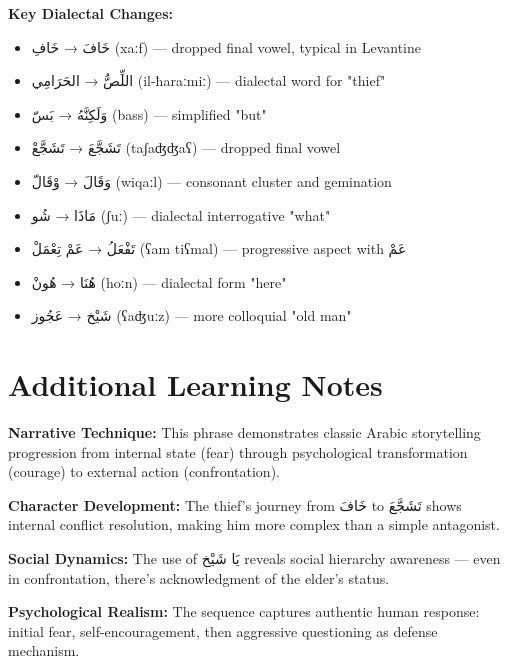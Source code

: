 \documentclass[letterpaper,12pt]{article}
\begin{document}
\textbf{Key Dialectal Changes:}
\begin{itemize}
\item \textarabic{خَافَ} → \textarabic{خَافِ} (xaːf) — dropped final vowel, typical in Levantine
\item \textarabic{اللِّصُّ} → \textarabic{الحَرَامِي} (il-ħaraːmiː) — dialectal word for "thief"
\item \textarabic{وَلَكِنَّهُ} → \textarabic{بَسّ} (bass) — simplified "but"
\item \textarabic{تَشَجَّعَ} → \textarabic{تَشَجَّعْ} (taʃaʤʤaʕ) — dropped final vowel
\item \textarabic{وَقَالَ} → \textarabic{وْقَالّ} (wiqaːl) — consonant cluster and gemination
\item \textarabic{مَاذَا} → \textarabic{شُو} (ʃuː) — dialectal interrogative "what"
\item \textarabic{تَفْعَلُ} → \textarabic{عَمْ تِعْمَلْ} (ʕam tiʕmal) — progressive aspect with \textarabic{عَمْ}
\item \textarabic{هُنَا} → \textarabic{هُونْ} (hoːn) — dialectal form "here"
\item \textarabic{شَيْخ} → \textarabic{عَجُوز} (ʕaʤuːz) — more colloquial "old man"
\end{itemize}

\section{Additional Learning Notes}

\begin{tcolorbox}[colback=boxcolor,colframe=accentcolor,title=\textbf{Cultural and Literary Context},breakable]
\textbf{Narrative Technique:} This phrase demonstrates classic Arabic storytelling progression from internal state (fear) through psychological transformation (courage) to external action (confrontation).

\textbf{Character Development:} The thief's journey from \textarabic{خَافَ} to \textarabic{تَشَجَّعَ} shows internal conflict resolution, making him more complex than a simple antagonist.

\textbf{Social Dynamics:} The use of \textarabic{يَا شَيْخ} reveals social hierarchy awareness — even in confrontation, there's acknowledgment of the elder's status.

\textbf{Psychological Realism:} The sequence captures authentic human response: initial fear, self-encouragement, then aggressive questioning as defense mechanism.
\end{tcolorbox}
\end{document}
